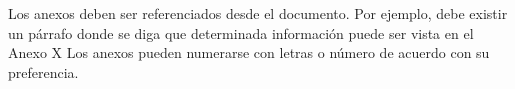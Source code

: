 
\chapter*{\annexesTitle}

Los anexos deben ser referenciados desde el documento. Por ejemplo, debe existir un párrafo donde se diga que determinada información puede ser vista en el Anexo X
Los anexos pueden numerarse con letras o número de acuerdo con su preferencia.

\label{LastMainPage}

\newpage


